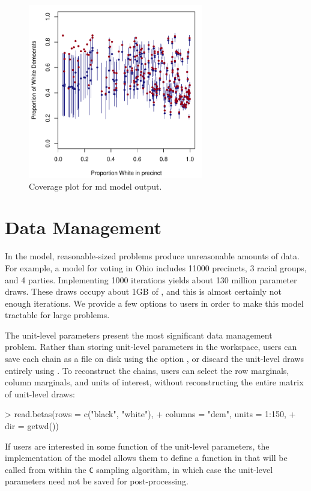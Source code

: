 \begin{figure}[h]
\begin{center}
\includegraphics[width=3in]{coversmall.pdf}
\end{center}
\caption{Coverage plot for {\sc md} model output.}
\label{f:md}
\end{figure}
 
\section*{Data Management}

In the  model, reasonable-sized problems produce unreasonable
amounts of data.  For example, a model for voting in Ohio includes
11000 precincts, 3 racial groups, and 4 parties.  Implementing 1000
iterations yields about 130 million parameter draws.  These draws
occupy about 1GB of , and this is almost certainly not enough
iterations.  We provide a few options to users in order to make this
model tractable for large  problems. 

The unit-level parameters present the most significant data management
problem.  Rather than storing unit-level parameters in the workspace, users can
save each chain as a  file on disk using the option
, or discard the unit-level
draws entirely using .  To
reconstruct the chains, users can select the row marginals, column
marginals, and units of interest, without reconstructing the entire
matrix of unit-level draws:   
\begin{smallexample}
> read.betas(rows = c("black", "white"), 
+   columns = "dem", units = 1:150, 
+   dir = getwd())
\end{smallexample}
If users are interested in some function of the unit-level parameters,
the implementation of the  model allows them to define a
function in \R{} that will be called from within the {\tt C}
sampling algorithm, in which case the unit-level parameters need not
be saved for post-processing.

